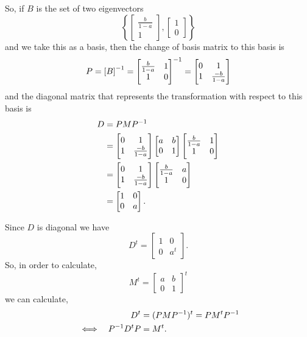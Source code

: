\documentclass[../MathsNotesBase.tex]{subfiles}
\begin{document}
{		
		\bigskip
		So, if $B$ is the set of two eigenvectors
		\[ \left\{ \begin{bmatrix}\frac{b}{1 - a}\\1\end{bmatrix}, \begin{bmatrix}1\\0\end{bmatrix} \right\} \]
		and we take this as a basis, then the change of basis matrix to this basis is
		\[ P = {[B]}^{-1} = {\begin{bmatrix}\frac{b}{1 - a} & 1\\1 & 0\end{bmatrix}}^{-1} 
			= \begin{bmatrix}0 & 1\\1 & \frac{-b}{1 - a}\end{bmatrix} 
		\]
		and the diagonal matrix that represents the transformation with respect to this basis is
		\begin{align*}
		D &= PM{P}^{-1} \\
		&= \begin{bmatrix}0 & 1\\1 & \frac{-b}{1 - a}\end{bmatrix}
		\begin{bmatrix}
		a & b\\
		0 & 1
		\end{bmatrix}
		\begin{bmatrix}\frac{b}{1 - a} & 1\\1 & 0\end{bmatrix}\\
		&= \begin{bmatrix}0 & 1\\1 & \frac{-b}{1 - a}\end{bmatrix}
		\begin{bmatrix}\frac{b}{1 - a} & a\\1 & 0\end{bmatrix}\\
		&= \begin{bmatrix}1 & 0\\0 & a\end{bmatrix}.
		\end{align*}

		Since $D$ is diagonal we have
		\[ {D}^t = \begin{bmatrix}1 & 0\\0 & a^t\end{bmatrix}. \]
		So, in order to calculate,
		\[ M^t = \begin{bmatrix}
					a & b\\
					0 & 1
				 \end{bmatrix}^t
		 \]
		 we can calculate,
		 \begin{align*}
		 && {D}^t &= (PM{P}^{-1})^t = PM^t{P}^{-1} \\
		 &\iff & {P}^{-1}{D}^tP &= M^t. \\
		 \end{align*}
		 
}
\end{document}
